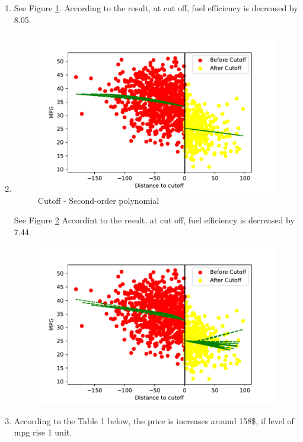 \documentclass{article}
\begin{document}
\begin{enumerate}
\item 
See Figure \ref{fig:Q5}.
According to the result, at cut off, fuel efficiency is decreased by 8.05.


\item

\begin{figure}[ht]
    \centering
     \includegraphics{HW6Q4a.pdf}
    \caption{Cutoff - Second-order polynomial}
    \label{fig:Q5}
\end{figure}


 See Figure \ref{fig:Q4}
 Accordint to the result, at cut off, fuel efficiency is decreased by 7.44.


\begin{figure}[]
    \centering
     \includegraphics{HW6Q5a.pdf}
    \caption{}
    \label{fig:Q4}
\end{figure}

\item According to the Table 1 below, the price is increases around 158\$, if level of mpg rise 1 unit.  
\vspace{0.5cm}
\begin{table}[ht]
    \centering
    
    \caption{}
    \label{tab:ta1}
\end{table}


\end{enumerate}
\end{document}
